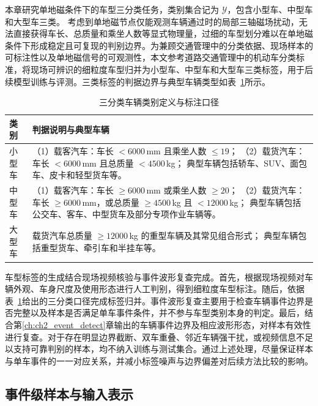 \documentclass{xdupgthesis}
\begin{document}
本章研究单地磁条件下的车型三分类任务，类别集合记为 $\mathcal{Y}$，包含小型车、中型车和大型车三类。
考虑到单地磁节点仅能观测车辆通过时的局部三轴磁场扰动，无法直接获得车长、总质量和乘坐人数等显式物理量，过细的车型划分难以在单地磁条件下形成稳定且可复现的判别边界。为兼顾交通管理中的分类依据、现场样本的可标注性以及单地磁信号的可观测性，本文参考道路交通管理中的机动车分类标准\cite{ch3_mps_ga8022019}，将现场可辨识的细粒度车型归并为小型车、中型车和大型车三类标签，用于后续模型训练与评测。三类标签的判据边界与典型车辆类型如表~\ref{tab:ch3_label_rule}所示。

\begin{table}[!htbp]
\centering
\small
\caption{三分类车辆类别定义与标注口径}
\label{tab:ch3_label_rule}
\renewcommand{\arraystretch}{1.25}
\setlength{\tabcolsep}{4pt}
\begin{tabular}{p{2.0cm} p{10.8cm}}
\hline
类别 & 判据说明与典型车辆 \\
\hline
小型车 &
（1）载客汽车：车长 $<6000$\,mm 且乘坐人数 $\le 19$；
（2）载货汽车：车长 $<6000$\,mm 且总质量 $<4500$\,kg；
典型车辆包括轿车、SUV、面包车、皮卡和轻型货车等。\\
中型车 &
（1）载客汽车：车长 $\ge 6000$\,mm 或乘坐人数 $\ge 20$；
（2）载货汽车：车长 $\ge 6000$\,mm，或总质量 $\ge 4500$\,kg 且 $<12000$\,kg；
典型车辆包括公交车、客车、中型货车及部分专项作业车辆等。\\
大型车 &
载货汽车总质量 $\ge 12000$\,kg 的重型车辆及其常见组合形式；
典型车辆包括重型货车、牵引车和半挂车等。\\
\hline
\end{tabular}
\end{table}

车型标签的生成结合现场视频核验与事件波形复查完成。首先，根据现场视频对车辆外观、车身尺度及使用形态进行人工判别，得到细粒度车型标注。随后，依据表~\ref{tab:ch3_label_rule}给出的三分类口径完成标签归并。事件波形复查主要用于检查车辆事件边界是否完整以及样本是否满足单车事件条件，并不参与车型类别本身的判定。最后，结合第\ref{ch:ch2_event_detect}章输出的车辆事件边界及相应波形形态，对样本有效性进行复查。对于存在明显边界截断、双车重叠、邻近车辆强干扰，或视频信息不足以支持可靠判别的样本，均不纳入训练与测试集合。通过上述处理，尽量保证样本与单车事件的一一对应关系，并减小标签噪声与边界偏差对后续方法比较的影响。

\subsection{事件级样本与输入表示}
\label{subsec:ch3_sample_repr}
\end{document}
